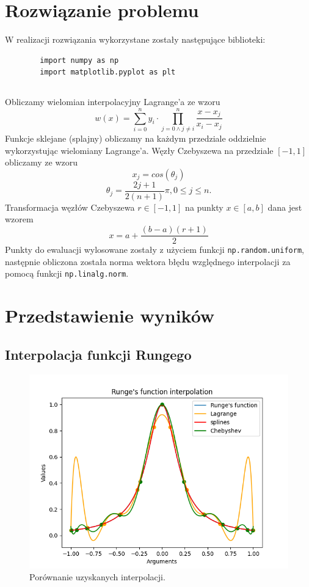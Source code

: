 \documentclass[11pt]{scrartcl}
\begin{document}
    \section{Rozwiązanie problemu}
    W realizacji rozwiązania wykorzystane zostały następujące
    biblioteki:
    \begin{lstlisting}
        import numpy as np
        import matplotlib.pyplot as plt
    \end{lstlisting}

    \subsection*{}
    Obliczamy wielomian interpolacyjny Lagrange'a ze wzoru
    \[
        w(x)=\sum_{i=0}^{n}y_i \cdot \prod_{j=0 \land j \neq i}^{n}
        \frac{x-x_j}{x_i-x_j}
    \]
    Funkcje sklejane (splajny) obliczamy na każdym przedziale
    oddzielnie wykorzystując wielomiany Lagrange'a. Węzły
    Czebyszewa na przedziale $[-1,1]$ obliczamy ze wzoru
    \[
        x_j=cos(\theta_j)
    \]
    \[
        \theta_j=\frac{2j+1}{2(n+1)}\pi, 0 \leq j \leq n.
    \]
    Transformacja węzłów Czebyszewa $r \in [-1,1]$ na punkty
    $x \in [a,b]$ dana jest wzorem
    \[
        x=a+ \frac{(b-a)(r+1)}{2}
    \]
    Punkty do ewaluacji wylosowane zostały z użyciem funkcji
    \texttt{np.random.uniform}, następnie obliczona została norma
    wektora błędu względnego interpolacji za pomocą funkcji
    \texttt{np.linalg.norm}.
    
    \section{Przedstawienie wyników}

    \subsection{Interpolacja funkcji Rungego}
    \begin{figure}[H]
        \centering
        \includegraphics[width=0.8\linewidth]{interpolation1.png}
        \caption{Porównanie uzyskanych interpolacji.}
    \end{figure}
\end{document}
